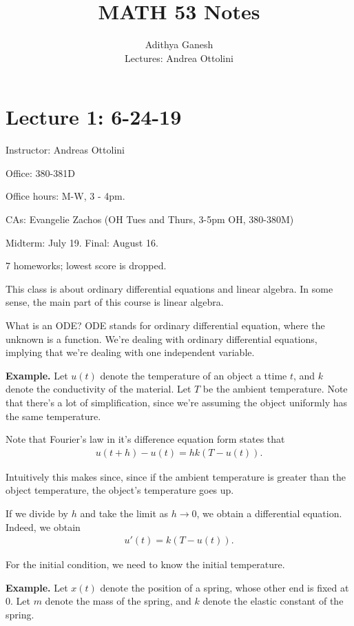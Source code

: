 \documentclass{article}
\title{MATH 53 Notes}
\author{Adithya Ganesh \\ Lectures: Andrea Ottolini}
\begin{document}
\maketitle

\tableofcontents

\section{Lecture 1: 6-24-19}

Instructor: Andreas Ottolini

Office: 380-381D

Office hours: M-W, 3 - 4pm.

CAs: Evangelie Zachos (OH Tues and Thurs, 3-5pm OH, 380-380M)

Midterm: July 19.  Final: August 16.

7 homeworks; lowest score is dropped.

This class is about ordinary differential equations and linear algebra.  In some sense, the main part of this course is linear algebra.

What is an ODE?  ODE stands for ordinary differential equation, where the unknown is a function.  We're dealing with ordinary differential equations, implying that we're dealing with one independent variable.

{\bf Example.} Let $u(t)$ denote the temperature of an object a ttime $t$, and $k$ denote the conductivity of the material.  Let $T$ be the ambient temperature.  Note that there's a lot of simplification, since we're assuming the object uniformly has the same temperature.

Note that Fourier's law in it's difference equation form states that
\begin{align*}
  u(t+h) - u(t) = hk (T - u(t)).
\end{align*}

Intuitively this makes since, since if the ambient temperature is greater than the object temperature, the object's temperature goes up.  

If we divide by $h$ and take the limit as $h \to 0$, we obtain a differential equation.  Indeed, we obtain
\begin{align*}
  u'(t) = k(T - u(t)).
\end{align*}

For the initial condition, we need to know the initial temperature.

{\bf Example.} Let $x(t)$ denote the position of a spring, whose other end is fixed at 0.  Let $m$ denote the mass of the spring, and $k$ denote the elastic constant of the spring.
\end{document}
